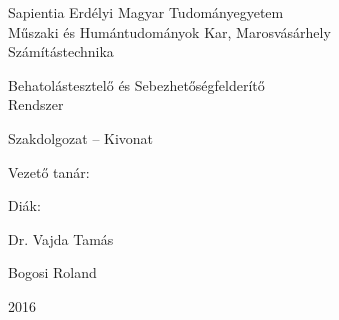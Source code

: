 
\renewcommand{\listoflistingscaption}{Kódrészletek jegyzéke}
\renewcommand{\listingscaption}{Kódrészlet}

\newpage
\pagestyle{empty}

	\begin{center}
		{\Large Sapientia Erdélyi Magyar Tudományegyetem}\\\vspace{0.05in}
		{\Large Műszaki és Humántudományok Kar, Marosvásárhely}\\\vspace{0.07in}
		{\Large Számítástechnika}\\
		
		\vspace{2.35in}
		
		{\huge Behatolástesztelő és Sebezhetőségfelderítő}\\\vspace{0.15in}
		{\huge Rendszer}
		
		\vspace{0.5in}
		
		{\LARGE Szakdolgozat -- Kivonat}
		
	\end{center}
	
	\vspace{2.0in}
	
	\begin{multicols}{2}
		\begin{flushleft}
			{\Large Vezető tanár:}
		\end{flushleft}
		\columnbreak
		\begin{flushright}
			{\Large Diák:}
		\end{flushright}
	\end{multicols}
	\begin{multicols}{2}
		\begin{flushleft}
			{\LARGE Dr. Vajda Tamás}
		\end{flushleft}
		\columnbreak
		\begin{flushright}
			{\LARGE Bogosi Roland}
		\end{flushright}
	\end{multicols}
	
	\vspace{1.5in}
		
	\begin{center}
		{\LARGE 2016}
	\end{center}

